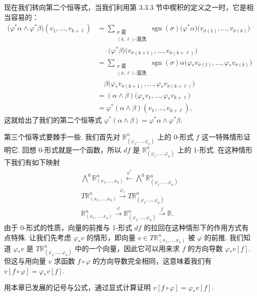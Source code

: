 现在我们转向第二个恒等式，当我们利用第 3.3.3 节中楔积的定义之一时，它是相当容易的：
\begin{align*}
\bigl(\varphi^*\alpha\wedge\varphi^*\beta\bigr)(v_1,\ldots,v_{k+\ell})
&=\sum_{\substack{\sigma\text{ 是}\\(k,\ell)\text{-混洗}}}\operatorname{sgn}(\sigma)\bigl(\varphi^*\alpha\bigr)\bigl(v_{\sigma(1)},\ldots,v_{\sigma(k)}\bigr)\\
&\quad\cdot\bigl(\varphi^*\beta\bigr)\bigl(v_{\sigma(k+1)},\ldots,v_{\sigma(k+\ell)}\bigr)\\
&=\sum_{\substack{\sigma\text{ 是}\\(k,\ell)\text{-混洗}}}\operatorname{sgn}(\sigma)\alpha\bigl(\varphi_*v_{\sigma(1)},\ldots,\varphi_*v_{\sigma(k)}\bigr)\\
&\quad\beta\bigl(\varphi_*v_{\sigma(k+1)},\ldots,\varphi_*v_{\sigma(k+\ell)}\bigr)\\
&=(\alpha\wedge\beta)\bigl(\varphi_*v_1,\ldots,\varphi_*v_{k+\ell}\bigr)\\
&=\varphi^*(\alpha\wedge\beta)(v_1,\ldots,v_{k+\ell}),
\end{align*}
这就给出了我们的第二个恒等式 $\varphi^*(\alpha\wedge\beta)=\varphi^*\alpha\wedge\varphi^*\beta$.

第三个恒等式要棘手一些. 我们首先对 $\mathbb{R}^n_{(\varphi_1,\ldots,\varphi_n)}$ 上的 0-形式 $f$ 这一特殊情形证明它. 回想 0-形式就是一个函数，所以 $df$ 是 $\mathbb{R}^n_{(\varphi_1,\ldots,\varphi_n)}$ 上的 1-形式. 在这种情形下我们有如下映射
\[
\begin{gathered}
\bigwedge^0\mathbb{R}^n_{(x_1,\ldots,x_n)}\xleftarrow{\varphi^*}\bigwedge^0\mathbb{R}^n_{(\varphi_1,\ldots,\varphi_n)}\\
T\mathbb{R}^n_{(x_1,\ldots,x_n)}\xrightarrow{\varphi_*}T\mathbb{R}^n_{(\varphi_1,\ldots,\varphi_n)}\\
\mathbb{R}^n_{(x_1,\ldots,x_n)}\xrightarrow{\varphi}\mathbb{R}^n_{(\varphi_1,\ldots,\varphi_n)}\xrightarrow{f}\mathbb{R}.
\end{gathered}
\]
由于 0-形式的性质，向量的前推与 1-形式 $df$ 的拉回在这种情形下的作用方式有点特殊. 让我们先考虑 $\varphi_*v$ 的情形，即向量 $v\in T\mathbb{R}^n_{(x_1,\ldots,x_n)}$ 被 $\varphi$ 的前推. 我们知道 $\varphi_*v$ 是 $T\mathbb{R}^n_{(\varphi_1,\ldots,\varphi_n)}$ 中的一个向量，因此它可以用来求 $f$ 的方向导数 $\varphi_*v[f]$. 但这与用向量 $v$ 求函数 $f\circ\varphi$ 的方向导数完全相同，这意味着我们有 $v[f\circ\varphi]=\varphi_*v[f]$.

\begin{question}\label{q:6-18}
用本章已发展的记号与公式，通过显式计算证明 $v[f\circ\varphi]=\varphi_*v[f]$.
\end{question}

